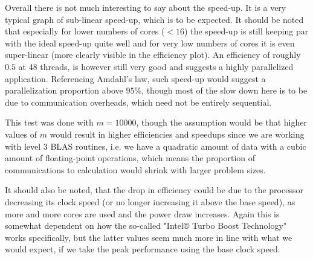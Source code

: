 \documentclass{scrartcl}
\begin{document}
	Overall there is not much interesting to say about the speed-up. 
	It is a very typical graph of sub-linear speed-up, which is to be expected.
	It should be noted that especially for lower numbers of cores ($<16$) the speed-up is still keeping par with the ideal speed-up quite well and for very low numbers of cores it is even super-linear (more clearly visible in the efficiency plot).
	An efficiency of roughly $0.5$ at 48 threads, is however still very good and suggests a highly parallelized application.
	Referencing Amdahl's law, such speed-up would suggest a parallelization proportion above $95\%$, though most of the slow down here is to be due to communication overheads, which need not be entirely sequential.
	
	This test was done with $m=10000$, though the assumption would be that higher values of $m$ would result in higher efficiencies and speedups since we are working with level 3 BLAS routines, i.e. we have a quadratic amount of data with a cubic amount of floating-point operations, which means the proportion of communications to calculation would shrink with larger problem sizes.
	
	It should also be noted, that the drop in efficiency could be due to the processor decreasing its clock speed (or no longer increasing it above the base speed), as more and more cores are used and the power draw increases.
	Again this is somewhat dependent on how the so-called "Intel® Turbo Boost Technology" works specifically, but the latter values seem much more in line with what we would expect, if we take the peak performance using the base clock speed.
	
\end{document}
